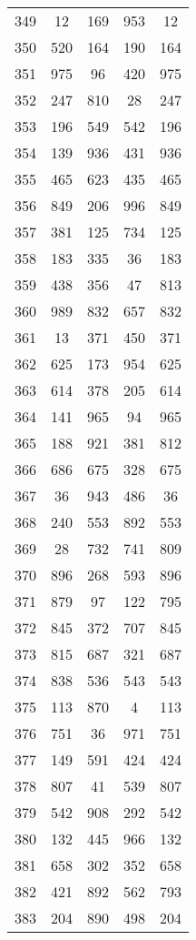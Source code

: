 \documentclass[a4paper,10pt,ngerman]{scrartcl}
\begin{document}
\begin{longtable}[c]{c|c|c|c|c}
    349 & 12 & 169 & 953 & 12 \\
    350 & 520 & 164 & 190 & 164 \\
    351 & 975 & 96 & 420 & 975 \\
    352 & 247 & 810 & 28 & 247 \\
    353 & 196 & 549 & 542 & 196 \\
    354 & 139 & 936 & 431 & 936 \\
    355 & 465 & 623 & 435 & 465 \\
    356 & 849 & 206 & 996 & 849 \\
    357 & 381 & 125 & 734 & 125 \\
    358 & 183 & 335 & 36 & 183 \\
    359 & 438 & 356 & 47 & 813 \\
    360 & 989 & 832 & 657 & 832 \\
    361 & 13 & 371 & 450 & 371 \\
    362 & 625 & 173 & 954 & 625 \\
    363 & 614 & 378 & 205 & 614 \\
    364 & 141 & 965 & 94 & 965 \\
    365 & 188 & 921 & 381 & 812 \\
    366 & 686 & 675 & 328 & 675 \\
    367 & 36 & 943 & 486 & 36 \\
    368 & 240 & 553 & 892 & 553 \\
    369 & 28 & 732 & 741 & 809 \\
    370 & 896 & 268 & 593 & 896 \\
    371 & 879 & 97 & 122 & 795 \\
    372 & 845 & 372 & 707 & 845 \\
    373 & 815 & 687 & 321 & 687 \\
    374 & 838 & 536 & 543 & 543 \\
    375 & 113 & 870 & 4 & 113 \\
    376 & 751 & 36 & 971 & 751 \\
    377 & 149 & 591 & 424 & 424 \\
    378 & 807 & 41 & 539 & 807 \\
    379 & 542 & 908 & 292 & 542 \\
    380 & 132 & 445 & 966 & 132 \\
    381 & 658 & 302 & 352 & 658 \\
    382 & 421 & 892 & 562 & 793 \\
    383 & 204 & 890 & 498 & 204 \\

\end{longtable}
\end{document}

